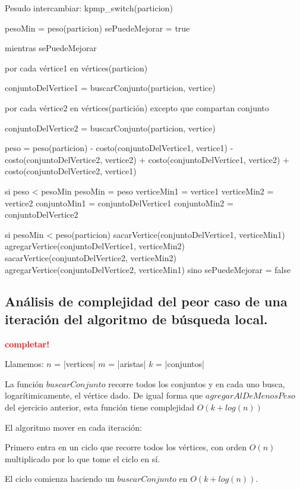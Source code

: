 Pesudo intercambiar:
kpmp_switch(particion) {
	pesoMin = peso(particion)
	sePuedeMejorar = true

	mientras sePuedeMejorar {
		por cada vértice1 en vértices(particion) {
			conjuntoDelVertice1 = buscarConjunto(particion, vertice)

			por cada vértice2 en vértices(partición) excepto que compartan conjunto {
				conjuntoDelVertice2 = buscarConjunto(particion, vertice)

				peso = peso(particion)
					- costo(conjuntoDelVertice1, vertice1)
					- costo(conjuntoDelVertice2, vertice2)
					+ costo(conjuntoDelVertice1, vertice2)
					+ costo(conjuntoDelVertice2, vertice1)


				si peso < pesoMin {
					pesoMin = peso
					verticeMin1 = vertice1
					verticeMin2 = vertice2
					conjuntoMin1 = conjuntoDelVertice1
					conjuntoMin2 = conjuntoDelVertice2
				}
			}
		}

		si pesoMin < peso(particion) {
			sacarVertice(conjuntoDelVertice1, verticeMin1)
			agregarVertice(conjuntoDelVertice1, verticeMin2)
			sacarVertice(conjuntoDelVertice2, verticeMin2)
			agregarVertice(conjuntoDelVertice2, verticeMin1)
		} sino {
			sePuedeMejorar = false
		}
	}
}

\newpage
\subsection{Análisis de complejidad del peor caso de una iteración del
            algoritmo de búsqueda local.}
\vspace*{0.3cm}
\textcolor{red}{\textbf{completar!}}

Llamemos:
$n$ = |vertices|
$m$ = |aristas|
$k$ = |conjuntos|

\vspace*{0.3cm}

La función $buscarConjunto$ recorre todos los conjuntos y en cada uno busca,
logarítimicamente, el vértice dado. De igual forma que $agregarAlDeMenosPeso$
del ejercicio anterior, esta función tiene complejidad $O(k + log(n))$

\vspace*{0.3cm}

El algoritmo mover en cada iteración:

Primero entra en un ciclo que recorre todos los vértices, con orden $O(n)$
multiplicado por lo que tome el ciclo en sí.

El ciclo comienza haciendo un $buscarConjunto$ en $O(k + log(n))$.

